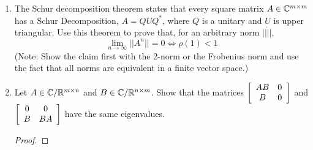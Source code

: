 \documentclass{article}
\begin{document}
\begin{enumerate}
\begin{enumerate}
\item 
\begin{proof}
    hey
\end{proof}


\end{enumerate}

\item %
The Schur decomposition theorem states that every square matrix $A\in \mathbb{C}^{m\times m}$ has a Schur Decomposition, $A = QUQ^*$, where $Q$ is a unitary and $U$ is upper triangular. Use this theorem to prove that, for an arbitrary norm $|| \dot ||$, 
\[
    \lim_{n\to \infty} ||A^n|| = 0 \Longleftrightarrow \rho(1) < 1
\]
(Note: Show the claim first with the 2-norm or the Frobenius norm and use the fact that all norms are equivalent in a finite vector space.)

\item   %
Let $A \in \mathbb{C}/\mathbb{R}^{m\times n}$ and $B \in \mathbb{C}/\mathbb{R}^{n \times m}$. Show that the matrices $\left[\begin{array}{c c} AB & 0 \\ B & 0\end{array}\right]$ and $\left[\begin{array}{c c} 0 & 0 \\ B & BA \end{array}\right]$ have the same eigenvalues. 

\begin{proof}
   

\end{proof}
\end{enumerate}
\end{document}
